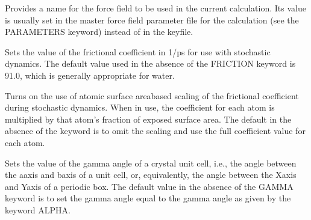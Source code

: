 \documentclass[letterpaper,11pt,english]{sphinxmanual}
\begin{document}















  Provides a name for the force field to be used in the current calculation. Its value is usually set in the master force field parameter file for the calculation (see the PARAMETERS keyword) instead of in the keyfile.

  Sets the value of the frictional coefficient in 1/ps for use with stochastic dynamics. The default value used in the absence of the FRICTION keyword is 91.0, which is generally appropriate for water.

  Turns on the use of atomic surface area\sphinxhyphen{}based scaling of the frictional coefficient during stochastic dynamics. When in use, the coefficient for each atom is multiplied by that atom’s fraction of exposed surface area. The default in the absence of the keyword is to omit the scaling and use the full coefficient value for each atom.

  Sets the value of the gamma angle of a crystal unit cell, i.e., the angle between the a\sphinxhyphen{}axis and b\sphinxhyphen{}axis of a unit cell, or, equivalently, the angle between the X\sphinxhyphen{}axis and Y\sphinxhyphen{}axis of a periodic box. The default value in the absence of the GAMMA keyword is to set the gamma angle equal to the gamma angle as given by the keyword ALPHA.
\end{document}
